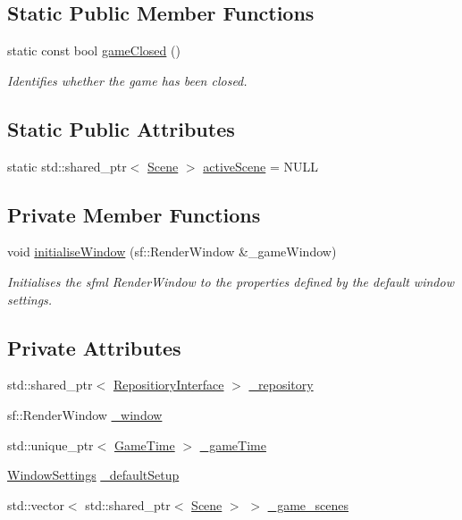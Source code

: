 \subsection*{Static Public Member Functions}
\begin{DoxyCompactItemize}
\item 
static const bool \hyperlink{class_game_manager_a4eb94c6171bf3292eb57b291e2174289}{game\+Closed} ()
\begin{DoxyCompactList}\small\item\em Identifies whether the game has been closed. \end{DoxyCompactList}\end{DoxyCompactItemize}
\subsection*{Static Public Attributes}
\begin{DoxyCompactItemize}
\item 
static std\+::shared\+\_\+ptr$<$ \hyperlink{class_scene}{Scene} $>$ \hyperlink{class_game_manager_a969dd909c6b70310843d34e2490736b4}{active\+Scene} = N\+U\+LL
\end{DoxyCompactItemize}
\subsection*{Private Member Functions}
\begin{DoxyCompactItemize}
\item 
void \hyperlink{class_game_manager_a0a4c03ef0451371a98204c18c1faf9fd}{initialise\+Window} (sf\+::\+Render\+Window \&\+\_\+game\+Window)
\begin{DoxyCompactList}\small\item\em Initialises the sfml Render\+Window to the properties defined by the default window settings. \end{DoxyCompactList}\end{DoxyCompactItemize}
\subsection*{Private Attributes}
\begin{DoxyCompactItemize}
\item 
std\+::shared\+\_\+ptr$<$ \hyperlink{class_repositiory_interface}{Repositiory\+Interface} $>$ \hyperlink{class_game_manager_adf8ffad3969c2bee2332eb3ea58a3c9c}{\+\_\+repository}
\item 
sf\+::\+Render\+Window \hyperlink{class_game_manager_a0c91609e7557e4e97a0e4be541254a38}{\+\_\+window}
\item 
std\+::unique\+\_\+ptr$<$ \hyperlink{class_game_time}{Game\+Time} $>$ \hyperlink{class_game_manager_ae08fe7df616e789e4858645b56d9b73b}{\+\_\+game\+Time}
\item 
\hyperlink{struct_window_settings}{Window\+Settings} \hyperlink{class_game_manager_a06843f28cb1609e41da7eee19be9aa87}{\+\_\+default\+Setup}
\item 
std\+::vector$<$ std\+::shared\+\_\+ptr$<$ \hyperlink{class_scene}{Scene} $>$ $>$ \hyperlink{class_game_manager_a6be6c6b38c1b95d7fd84819eba50e618}{\+\_\+game\+\_\+scenes}
\end{DoxyCompactItemize}
